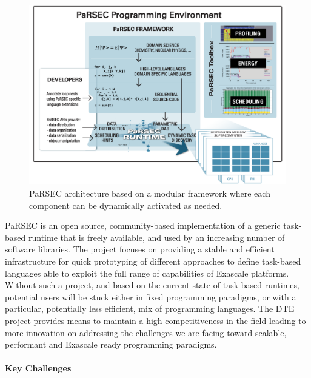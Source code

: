 \begin{figure}
  \includegraphics[scale=0.3]{projects/2.3.1-PMR/2.3.1.09-ParSEC/PaRSEC-diagram.png}
  \caption{PaRSEC architecture\label{fig:parsec} based on a modular framework where each
           component can be dynamically activated as needed.}
\end{figure}
%
PaRSEC is an open source, community-based implementation of a generic task-based
runtime that is freely available, and used by an increasing number of software
libraries.
The project focuses on providing a stable and efficient infrastructure for quick
prototyping of different approaches to define task-based languages able to
exploit the full range of capabilities of Exascale platforms. Without such a
project, and based on the current state of task-based runtimes, potential users
will be stuck either in fixed programming paradigms, or with a particular,
potentially less efficient, mix of programming languages. The DTE project
provides means to maintain a high competitiveness in the field leading to more
innovation on addressing the challenges we are facing toward scalable,
performant and Exascale ready programming paradigms.

\paragraph{Key Challenges}

